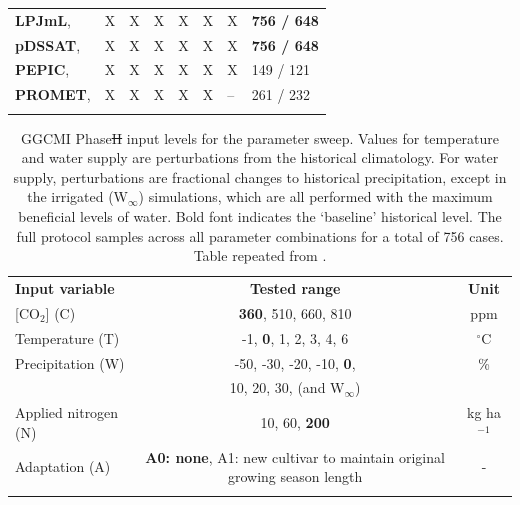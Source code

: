 \documentclass[gmdd]{copernicus} %
\providecommand{\DIFadd}[1]{{\protect\color{blue}\uwave{#1}}} %
\providecommand{\DIFdel}[1]{{\protect\color{red}\sout{#1}}}                      %
\providecommand{\DIFaddFL}[1]{\DIFadd{#1}} %
\providecommand{\DIFdelFL}[1]{\DIFdel{#1}} %
\providecommand{\DIFaddbeginFL}{} %
\providecommand{\DIFaddendFL}{} %
\providecommand{\DIFdelbeginFL}{} %
\providecommand{\DIFdelendFL}{} %
\begin{document}
\begin{table}[ht]
\begin{tabular}{p{6cm} p{1cm} p{1cm} p{1cm} p{1cm} p{1cm} p{1cm} p{1.9cm}}
        \textbf{LPJmL},     \citet{von_Bloh_implementing_2018} & X & X & X & X & X & X & \textbf{756 / 648}\\ \middlehline
        \textbf{pDSSAT},    \citet{Elliott2014b, JONES2003235} & X & X & X & X & X & X & \textbf{756 / 648}\\ \middlehline
        \textbf{PEPIC},     \citet{LIU2016164, LIU2016}        & X & X & X & X & X & X & 149 / 121\\ \middlehline
        \textbf{PROMET},    \citet{Hank2015, MAUSER2015, Zabel2019}  & X & X & X & X & X & -- & 261 / 232\\
        \bottomhline
    \end{tabular}
\end{table}

\begin{table}[ht]
    \caption{
    GGCMI Phase\DIFdelbeginFL \DIFdelFL{II }\DIFdelendFL \DIFaddbeginFL \DIFaddFL{~2 }\DIFaddendFL input levels for the parameter sweep. 
    Values for temperature and water supply are perturbations from the historical climatology. 
    For water supply, perturbations are fractional changes to historical precipitation, except in the irrigated (W$_{\infty}$) simulations, which are all performed with the maximum beneficial levels of water. 
    Bold font indicates the `baseline' historical level. 
    The full protocol samples across all parameter combinations for a total of 756 cases.
    Table repeated from
\citet{franke2020ctwnexperiment}.
    }
    \label{table:inputs} 
    \begin{tabular}{lcc} 
        \tophline \vspace{1mm}
        \textbf{Input variable} & \textbf{Tested range} & \textbf{Unit} \\ \middlehline \vspace{1mm}
        [CO$_2$] (C) & \textbf{360}, 510, 660, 810 & ppm\\ \middlehline \vspace{1mm}
        Temperature (T) & -1, \textbf{0}, 1, 2, 3, 4, 6 & $^{\circ}$C\\ \middlehline \vspace{1mm}
        Precipitation (W) & -50, -30, -20, -10, \textbf{0}, & \% \\
        {} & 10, 20, 30, (and W$_{\infty}$) & {} \\ \middlehline \vspace{1mm}
        Applied nitrogen (N) & 10, 60, \textbf{200} & kg ha$^{-1}$ \\ \middlehline \vspace{1mm}
        Adaptation (A) & \textbf{A0: none}, A1: new cultivar to maintain original growing season length & -\\ \bottomhline
    \end{tabular}\\
\end{table}
\end{document}
